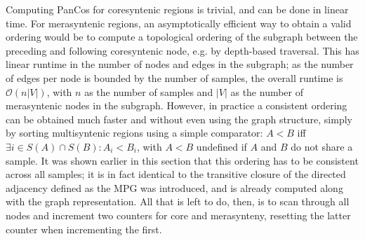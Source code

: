 
Computing PanCos for coresyntenic regions is trivial, and can be done in linear time.
For merasyntenic regions, an asymptotically efficient way to obtain a valid ordering would be to compute a topological ordering of the subgraph between the preceding and following coresyntenic node, e.g. by depth-based traversal.
This has linear runtime in the number of nodes and edges in the subgraph; as the number of edges per node is bounded by the number of samples, the overall runtime is $\mathcal{O}(n|V|)$, with $n$ as the number of samples and $|V|$ as the number of merasyntenic nodes in the subgraph.
However, in practice a consistent ordering can be obtained much faster and without even using the graph structure, simply by sorting multisyntenic regions using a simple comparator: $A<B$ iff $\exists i \in S(A) \cap S(B): A_i < B_i$, with $A<B$ undefined if $A$ and $B$ do not share a sample.
It was shown earlier in this section that this ordering has to be consistent across all samples; it is in fact identical to the transitive closure of the directed adjacency defined as the MPG was introduced, and is already computed along with the graph representation.
All that is left to do, then, is to scan through all nodes and increment two counters for core and merasynteny, resetting the latter counter when incrementing the first.

